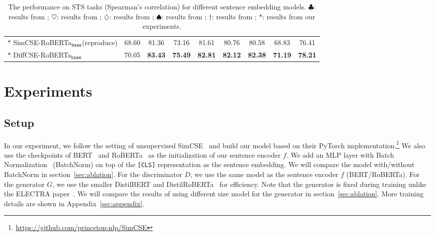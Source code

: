 \documentclass[11pt]{article}
\newcommand{\ba}{$_\texttt{base}$\xspace}
\begin{document}
\begin{table*}[th!]
\begin{center}
\begin{tabular}{lcccccccc}
        $*$ SimCSE-RoBERTa\ba {\scriptsize(reproduce)} &  68.60 & 81.36 & 73.16 & 81.61 & 80.76 & 80.58 & 68.83 & 76.41 \\
        $*$ DiffCSE-RoBERTa\ba & 70.05 & \bf 83.43 & \bf 75.49 & \bf 82.81 & \bf 82.12 & \bf 82.38 & \bf 71.19 & \bf 78.21 \\
    \bottomrule
    \end{tabular}
    \end{center}
\vspace{-3.5mm}
    \caption{
        The performance on STS tasks (Spearman's correlation) for different sentence embedding models.
        $\clubsuit$: results from \citet{reimers2019sentence};
        $\heartsuit$: results from \citet{zhang2020unsupervised};
        $\diamondsuit$: results from \citet{gao2021simcse};
        $\spadesuit$: results from \citet{yang2020universal};
        $\dagger$: results from \citet{kim2021self};
        $*$: results from our experiments.
    }
    \label{tab:main_sts}
\vspace{-2mm}
\end{table*} 
\section{Experiments}
\label{sec:exp}
\subsection{Setup}
In our experiment, we follow the setting of unsupervised SimCSE~\cite{gao2021simcse} and build our model based on their PyTorch implementation.\footnote{\label{github}\scriptsize \url{https://github.com/princeton-nlp/SimCSE}} We also use the checkpoints of BERT~\cite{devlin2019bert} and RoBERTa~\cite{liu2019roberta} as the initialization of our sentence encoder $f$. We add an MLP layer with Batch Normalization~\cite{ioffe2015batch} (BatchNorm) on top of the \texttt{[CLS]} representation as the sentence embedding. We will compare the model with/without BatchNorm in section~\ref{sec:ablation}. For the discriminator $D$, we use the same model as the sentence encoder $f$ (BERT/RoBERTa). For the generator $G$, we use the smaller DistilBERT and DistilRoBERTa~\cite{sanh2019distilbert} for efficiency. Note that the generator is fixed during training unlike the ELECTRA paper~\cite{clark2020electra}. We will compare the results of using different size model for the generator in section~\ref{sec:ablation}. More training details are shown in Appendix~\ref{sec:appendix}.
\end{document}
